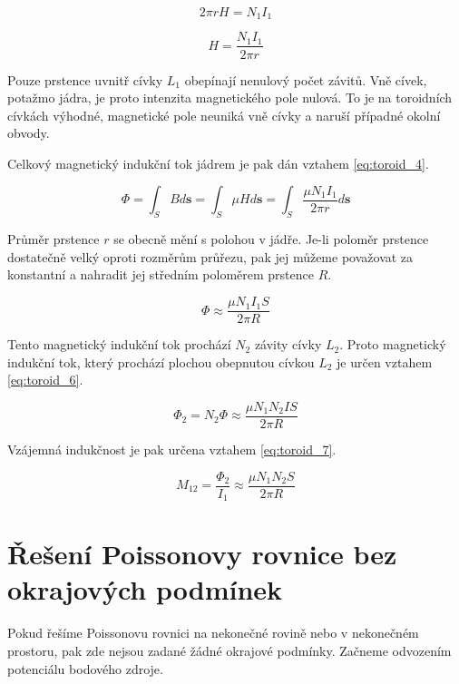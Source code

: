 \documentclass{book}
\newcommand{\vect}[1]{\boldsymbol{#1}}
\begin{document}
\begin{equation}
\label{eq:toroid_2}
2 \pi r H = N_1 I_1
\end{equation}

\begin{equation}
\label{eq:toroid_3}
H = \frac{N_1 I_1}{2 \pi r}
\end{equation}

Pouze prstence uvnitř cívky \(L_1\) obepínají nenulový počet závitů. Vně cívek, potažmo jádra, je proto intenzita magnetického pole nulová. To je na toroidních cívkách výhodné, magnetické pole neuniká
vně cívky a naruší případné okolní obvody.

Celkový magnetický indukční tok jádrem je pak dán vztahem \eqref{eq:toroid_4}.

\begin{equation}
\label{eq:toroid_4}
\Phi = \int_S B d\vect{s} = \int_S \mu H d\vect{s} = \int_S \frac{\mu N_1 I_1}{2 \pi r} d\vect{s}
\end{equation}

Průměr prstence \(r\) se obecně mění s polohou v jádře. Je-li poloměr prstence dostatečně velký oproti rozměrům průřezu, pak jej můžeme považovat za konstantní a nahradit jej středním poloměrem prstence \(R\).

\begin{equation}
\label{eq:toroid_5}
\Phi \approx \frac{\mu N_1 I_1 S}{2 \pi R}
\end{equation}

Tento magnetický indukční tok prochází \(N_2\) závity cívky \(L_2\). Proto magnetický indukční tok, který prochází plochou obepnutou cívkou \(L_2\) je určen vztahem \eqref{eq:toroid_6}.

\begin{equation}
\label{eq:toroid_6}
\Phi_2 = N_2 \Phi \approx \frac{\mu N_1 N_2 I S}{2 \pi R}
\end{equation}

Vzájemná indukčnost je pak určena vztahem \eqref{eq:toroid_7}.

\begin{equation}
\label{eq:toroid_7}
M_{12} = \frac{\Phi_2}{I_1} \approx \frac{\mu N_1 N_2 S}{2 \pi R}
\end{equation}

\chapter{Řešení Poissonovy rovnice bez okrajových podmínek}

Pokud řešíme Poissonovu rovnici na nekonečné rovině nebo v nekonečném prostoru, pak zde nejsou zadané žádné okrajové podmínky. Začneme odvozením
potenciálu bodového zdroje.
\end{document}
